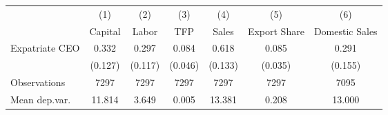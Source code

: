 \begin{tabular}{l*{6}{c}}
\hline\hline
                    &\multicolumn{1}{c}{(1)}&\multicolumn{1}{c}{(2)}&\multicolumn{1}{c}{(3)}&\multicolumn{1}{c}{(4)}&\multicolumn{1}{c}{(5)}&\multicolumn{1}{c}{(6)}\\
                    &\multicolumn{1}{c}{Capital}&\multicolumn{1}{c}{Labor}&\multicolumn{1}{c}{TFP}&\multicolumn{1}{c}{Sales}&\multicolumn{1}{c}{Export Share}&\multicolumn{1}{c}{Domestic Sales}\\
\hline
Expatriate CEO      &       0.332&       0.297&       0.084&       0.618&       0.085&       0.291\\
                    &     (0.127)&     (0.117)&     (0.046)&     (0.133)&     (0.035)&     (0.155)\\
\hline
Observations        &        7297&        7297&        7297&        7297&        7297&        7095\\
Mean dep.var.       &      11.814&       3.649&       0.005&      13.381&       0.208&      13.000\\
\hline\hline
\end{tabular}
